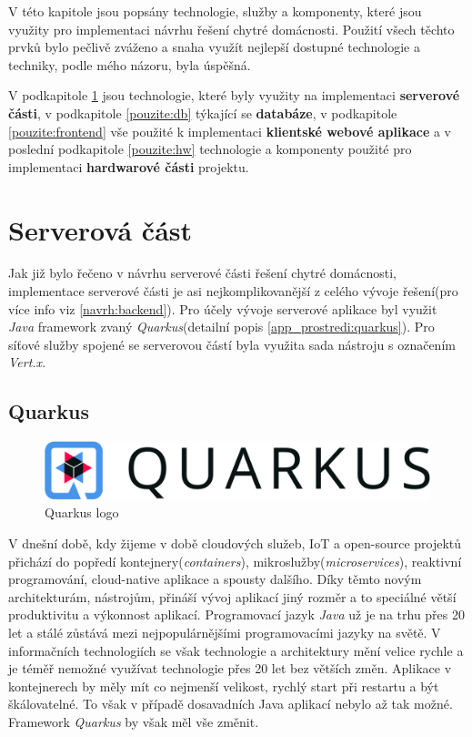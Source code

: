 V této kapitole jsou popsány technologie, služby a komponenty, které jsou využity pro implementaci návrhu řešení chytré domácnosti.
Použití všech těchto prvků bylo pečlivě zváženo a snaha využít nejlepší dostupné technologie a techniky, podle mého názoru, byla úspěšná.

V podkapitole \ref{pouzite:backend} jsou technologie, které byly využity na implementaci \textbf{serverové části}, v podkapitole \ref{pouzite:db} týkající se \textbf{databáze},
v podkapitole \ref{pouzite:frontend} vše použité k implementaci \textbf{klientské webové aplikace} a v poslední podkapitole \ref{pouzite:hw} technologie a komponenty použité pro implementaci \textbf{hardwarové části} projektu.

\section{Serverová část}
\label{pouzite:backend}
Jak již bylo řečeno v návrhu serverové části řešení chytré domácnosti, implementace serverové části je asi nejkomplikovanější z celého vývoje řešení(pro více info viz \ref{navrh:backend}).
Pro účely vývoje serverové aplikace byl využit \emph{Java} framework zvaný \emph{Quarkus}(detailní popis \ref{app_prostredi:quarkus}).
Pro síťové služby spojené se serverovou částí byla využita sada nástroju s označením \emph{Vert.x}.

\subsection*{Quarkus}
\label{pouzite:quarkus}

\begin{figure}[!ht]
  \centering
  \includegraphics[width=.45 \linewidth]{obrazky-figures/quarkus_logo.png}
  \caption{Quarkus logo}
  \label{figure:quarkus_logo}
\end{figure}

V dnešní době, kdy žijeme v době cloudových služeb, IoT a open-source projektů přichází do popředí kontejnery(\emph{containers}), mikroslužby(\emph{microservices}), reaktivní programování, cloud-native aplikace a spousty dalšího.
Díky těmto novým architekturám, nástrojům, přináší vývoj aplikací jiný rozměr a to speciálné větší produktivitu a výkonnost aplikací. Programovací jazyk \emph{Java} už je na trhu přes 20 let a stálé zůstává mezi nejpopulárnějšími programovacími jazyky na světě.
V informačních technologiích se však technologie a architektury mění velice rychle a je téměř nemožné využívat technologie přes 20 let bez větších změn. Aplikace v kontejnerech by měly mít co nejmenší velikost, rychlý start při restartu a být škálovatelné.
To však v případě dosavadních Java aplikací nebylo až tak možné. Framework \emph{Quarkus} by však měl vše změnit.

